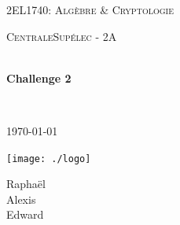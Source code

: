 \begin{titlepage}
\begin{center}


\LARGE \textsc{2EL1740: Algèbre \& Cryptologie}

\vspace{0.2cm}

\Large \textsc{CentraleSupélec - 2A}

\vspace{0.3cm}

\HRule \\[0.4cm]

{\huge \bfseries Challenge 2\\
[0.2cm]}

\HRule \\[0.4cm]

\vspace{2cm}

\textsc{\today}

\vspace{2cm}

\texttt{[image: ./logo]}~\\[3cm]

\begin{minipage}{0.4\textwidth}
\begin{spacing}{1.125}
\begin{center}
    Raphaël \\
    Alexis \\
    Edward 
\end{center}
\end{spacing}
\end{minipage}

\vfill

\end{center}
\end{titlepage}